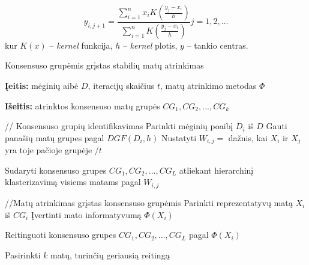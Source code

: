 \begin{equation}
\label{for_dgf}
  y_{i, j+1}=\frac{\sum_{i=1}^{n} x_i K(\frac{y_j - x_i}{h})}{\sum_{i=1}^{n} K(\frac{y_j - x_i}{h})} j=1,2,...
\end{equation}
kur $K(x)$ -- \textit{kernel} funkcija, $h$ -- \textit{kernel} plotis, $y$ -- tankio centras.

\begin{algorithm}
 \caption{Konsensuso grupėmis grįstas stabilių matų atrinkimas}
 \label{CGS}
 \begin{algorithmic}
   \item \textbf{Įeitis:} mėginių aibė $D$, iteracijų skaičius $t$, matų atrinkimo metodas $\Phi$\
   \item \textbf{Išeitis:} atrinktos konsensuso matų grupės $CG_1, CG_2,..., CG_k$
   \item // Konsensuso grupių identifikavimas
    \State Parinkti mėginių  poaibį $D_i$ iš $D$
    \State Gauti panašių matų grupes pagal $DGF(D_i, h)$
   \EndFor
    \State Nustatyti $W_{i,j}=$ dažnis, kai $X_i$ ir $X_j$ yra toje pačioje grupėje $/t$
   \EndFor
   \item Sudaryti konsensuso grupes $CG_1, CG_2,..., CG_L$ atliekant hierarchinį klasterizavimą visiems matams pagal $W_{i, j}$
   \item //Matų atrinkimas grįstas konsensuso grupėmis
    \State Parinkti reprezentatyvų matą $X_i$ iš $CG_i$
    \State Įvertinti mato informatyvumą $\Phi(X_i)$
   \EndFor
   \item Reitinguoti konsensuso grupes $CG_1, CG_2,..., CG_L$ pagal $\Phi(X_i)$
   \item Pasirinkti $k$ matų, turinčių geriausią reitingą  
 \end{algorithmic}
\end{algorithm}